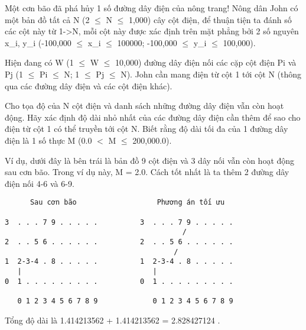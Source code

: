 Một cơn bão đã phá hủy 1 số đường dây điện của nông trang! Nông dân  John có một bản đồ tất cả N (2  $\le$  N  $\le$  1,000) cây cột điện, để thuận tiện ta đánh số các cột này từ 1->N, mỗi cột này được xác định  trên mặt phẳng bởi 2 số nguyên x\_i,  y\_i (-100,000  $\le$  x\_i  $\le$  100000; -100,000  $\le$  y\_i  $\le$  100,000).  

   Hiện đang có W (1  $\le$  W  $\le$  10,000) đường dây điện nối các cặp cột điện  Pi và Pj (1  $\le$  Pi  $\le$  N; 1  $\le$  Pj  $\le$  N).  John cần mang điện từ cột 1 tới cột N (thông qua các đường dây điện và  các cột điện khác).  

   Cho tọa độ của N cột điện và danh sách những đường dây điện vẫn còn hoạt  động. Hãy xác định độ dài nhỏ nhất của các đường dây điện cần thêm để sao  cho điện từ cột 1 có thể truyền tới cột N. Biết rằng độ dài tối đa của  1 đường dây điện là 1 số thực M (0.0 $<$ M  $\le$  200,000.0).  

   Ví dụ, dưới đây là bên trái là bản đồ 9 cột điện và 3 dây nối vẫn còn hoạt động sau cơn bão. Trong ví dụ này, M = 2.0. Cách tốt nhất là ta thêm 2 đường dây điện nối 4-6 và 6-9.  
\begin{verbatim}
      Sau cơn bão                   Phương án tối ưu

3  . . . 7 9 . . . . .          3  . . . 7 9 . . . . .
                                          /
2  . . 5 6 . . . . . .          2  . . 5 6 . . . . . .
                                        /
1  2-3-4 . 8 . . . . .          1  2-3-4 . 8 . . . . .
   |                               |
0  1 . . . . . . . . .          0  1 . . . . . . . . .

   0 1 2 3 4 5 6 7 8 9             0 1 2 3 4 5 6 7 8 9
\end{verbatim}

   Tổng độ dài là 1.414213562 + 1.414213562 = 2.828427124 .